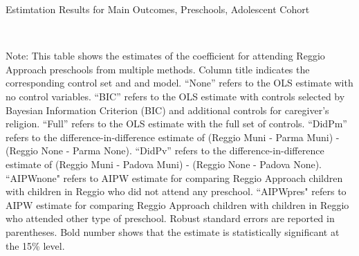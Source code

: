 \begin{table}[H] \caption{Estimtation Results for Main Outcomes, Preschools, Adolescent Cohort} \label{ols-M-adol-reg}
\scalebox{1}{}
\vspace{1ex} \\
\footnotesize\raggedright{Note: This table shows the estimates of the coefficient for attending Reggio Approach preschools from multiple methods. Column title indicates the corresponding control set and and model. ``None'' refers to the OLS estimate with no control variables. ``BIC'' refers to the OLS estimate with controls selected by Bayesian Information Criterion (BIC) and additional controls for caregiver's religion. ``Full'' refers to the OLS estimate with the full set of controls. ``DidPm'' refers to the difference-in-difference estimate of (Reggio Muni - Parma Muni) - (Reggio None - Parma None). ``DidPv'' refers to the difference-in-difference estimate of (Reggio Muni - Padova Muni) - (Reggio None - Padova None).  ``AIPWnone" refers to AIPW estimate for comparing Reggio Approach children with children in Reggio who did not attend any preschool. ``AIPWpres" refers to AIPW estimate for comparing Reggio Approach children with children in Reggio who attended other type of preschool. Robust standard errors are reported in parentheses. Bold number shows that the estimate is statistically significant at the 15\% level.}
\end{table}






